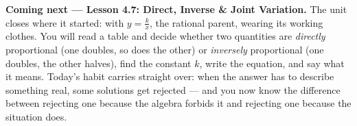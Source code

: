 \documentclass[10pt]{article}
\begin{document}
\begin{spiralbox}
\textbf{Coming next --- Lesson 4.7: Direct, Inverse \& Joint Variation.} The unit closes where it
started: with $y=\frac{k}{x}$, the rational parent, wearing its working clothes. You will read a table
and decide whether two quantities are \emph{directly} proportional (one doubles, so does the other) or
\emph{inversely} proportional (one doubles, the other halves), find the constant $k$, write the
equation, and say what it means. Today's habit carries straight over: when the answer has to describe
something real, some solutions get rejected --- and you now know the difference between rejecting one
because the algebra forbids it and rejecting one because the situation does.
\end{spiralbox}
\end{document}
